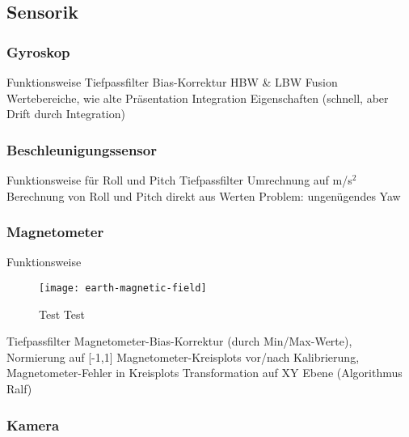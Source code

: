 
\subsection{Sensorik}


\subsubsection{Gyroskop}
Funktionsweise
Tiefpassfilter
Bias-Korrektur
HBW \& LBW Fusion
Wertebereiche, wie alte Präsentation
Integration
Eigenschaften (schnell, aber Drift durch Integration)


\subsubsection{Beschleunigungssensor}
Funktionsweise
für Roll und Pitch
Tiefpassfilter
Umrechnung auf m/s$^2$
Berechnung von Roll und Pitch direkt aus Werten
Problem: ungenügendes Yaw


\subsubsection{Magnetometer}
Funktionsweise

\begin{figure}
   \centering
   \texttt{[image: earth-magnetic-field]}
   \caption[Test]{Test Test}
   \label{fig:headtracking_test}
\end{figure}


Tiefpassfilter
Magnetometer-Bias-Korrektur (durch Min/Max-Werte), Normierung auf [-1,1]
Magnetometer-Kreisplots vor/nach Kalibrierung, Magnetometer-Fehler in Kreisplots
Transformation auf XY Ebene (Algorithmus Ralf)


\subsubsection{Kamera}

